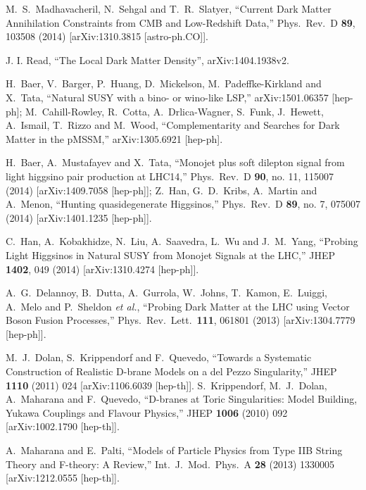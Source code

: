 \documentclass[11pt,a4paper]{article}
\begin{document}
\begin{thebibliography}{99}
  M.~S.~Madhavacheril, N.~Sehgal and T.~R.~Slatyer,
  ``Current Dark Matter Annihilation Constraints from CMB and Low-Redshift Data,''
  Phys.\ Rev.\ D {\bf 89}, 103508 (2014)
  [arXiv:1310.3815 [astro-ph.CO]].

 J. I. Read, ``The Local Dark Matter Density'', arXiv:1404.1938v2.
  
H.~Baer, V.~Barger, P.~Huang, D.~Mickelson, M.~Padeffke-Kirkland and X.~Tata,
  ``Natural SUSY with a bino- or wino-like LSP,''
  arXiv:1501.06357 [hep-ph];
  M.~Cahill-Rowley, R.~Cotta, A.~Drlica-Wagner, S.~Funk, J.~Hewett, A.~Ismail, T.~Rizzo and M.~Wood,
  ``Complementarity and Searches for Dark Matter in the pMSSM,''
  arXiv:1305.6921 [hep-ph].

H.~Baer, A.~Mustafayev and X.~Tata,
  ``Monojet plus soft dilepton signal from light higgsino pair production at LHC14,''
  Phys.\ Rev.\ D {\bf 90}, no. 11, 115007 (2014)
  [arXiv:1409.7058 [hep-ph]];
  Z.~Han, G.~D.~Kribs, A.~Martin and A.~Menon,
  ``Hunting quasidegenerate Higgsinos,''
  Phys.\ Rev.\ D {\bf 89}, no. 7, 075007 (2014)
  [arXiv:1401.1235 [hep-ph]].

C.~Han, A.~Kobakhidze, N.~Liu, A.~Saavedra, L.~Wu and J.~M.~Yang,
  ``Probing Light Higgsinos in Natural SUSY from Monojet Signals at the LHC,''
  JHEP {\bf 1402}, 049 (2014)
  [arXiv:1310.4274 [hep-ph]].

A.~G.~Delannoy, B.~Dutta, A.~Gurrola, W.~Johns, T.~Kamon, E.~Luiggi, A.~Melo and P.~Sheldon {\it et al.},
  ``Probing Dark Matter at the LHC using Vector Boson Fusion Processes,''
  Phys.\ Rev.\ Lett.\  {\bf 111}, 061801 (2013)
  [arXiv:1304.7779 [hep-ph]].

M.~J.~Dolan, S.~Krippendorf and F.~Quevedo,
  ``Towards a Systematic Construction of Realistic D-brane Models on a del Pezzo Singularity,''
  JHEP {\bf 1110} (2011) 024
  [arXiv:1106.6039 [hep-th]].
S.~Krippendorf, M.~J.~Dolan, A.~Maharana and F.~Quevedo,
  ``D-branes at Toric Singularities: Model Building, Yukawa Couplings and Flavour Physics,''
  JHEP {\bf 1006} (2010) 092
  [arXiv:1002.1790 [hep-th]].

  A.~Maharana and E.~Palti,
  ``Models of Particle Physics from Type IIB String Theory and F-theory: A Review,''
  Int.\ J.\ Mod.\ Phys.\ A {\bf 28} (2013) 1330005
  [arXiv:1212.0555 [hep-th]].


\end{thebibliography}
\end{document}
